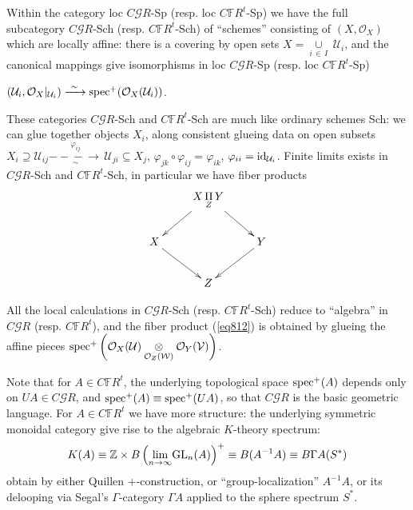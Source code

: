 \documentclass[leqno]{article}
\numberwithin{equation}{section}
\begin{document}
Within the category loc $C{\mathcal G} R$-Sp (resp. loc $C{\mathbb F} R^t$-Sp) we have the full subcategory $C{\mathcal G} R$-Sch (resp. $C{\mathbb F} R^t$-Sch) of ``schemes'' consisting of $(X , {\mathcal O}_X)$ which are locally affine: there is a covering by open sets \qquad \quad \qquad $X = \underset{i \, \in \, I}{\cup} \ {\mathcal U}_i$, and the canonical mappings give isomorphisms in loc $C{\mathcal G} R$-Sp (resp. loc $C{\mathbb F} R^t$-Sp) 

\noindent $({\mathcal U}_i , {\mathcal O}_X \vert_{{\mathcal U}_i}) \xrightarrow{ \ \sim \ } {\rm spec}^+ ({\mathcal O}_X ({\mathcal U}_i))$.

\smallskip

These categories $C{\mathcal G} R$-Sch and $C{\mathbb F} R^t$-Sch are much like ordinary schemes Sch: we can glue together objects $X_i$, along consistent glueing data on open subsets $X_i \supseteq {\mathcal U}_{ij} \underset{\sim}{\overset{\varphi_{ij}}{-\!\!\!-\!\!\!-\!\!\!\longrightarrow}} \, {\mathcal U}_{ji} \subseteq X_j$, $\varphi_{jk} \circ \varphi_{ij} = \varphi_{ik}$, $\varphi_{ii} = {\rm id}_{{\mathcal U}_i}$. Finite limits exists in $C{\mathcal G} R$-Sch and $C{\mathbb F} R^t$-Sch, in particular we have fiber products
\begin{equation}
\label{eq812}
\xymatrix{
&X \, \underset{Z}{\Pi} \, Y \ar[ld] \ar[rd] \\
X\ar[rd] &&Y \ar[ld] \\
&Z
}
\end{equation}

All the local calculations in $C{\mathcal G} R$-Sch (resp. $C{\mathbb F} R^t$-Sch) reduce to ``algebra'' in $C{\mathcal G} R$ (resp. $C{\mathbb F} R^t$), and the fiber product (\ref{eq812}) is obtained by glueing the affine pieces ${\rm spec}^+ \left( {\mathcal O}_X ({\mathcal U}) \underset{{\mathcal O}_Z({\mathcal W})}{\otimes} {\mathcal O}_Y ({\mathcal V}) \right)$.

\smallskip

Note that for $A \in C{\mathbb F} R^t$, the underlying topological space ${\rm spec}^+ (A)$ depends only on $UA \in C{\mathcal G} R$, and ${\rm spec}^+ (A) \equiv {\rm spec}^+ (UA)$, so that $C{\mathcal G} R$ is the basic geometric language. For $A \in C{\mathbb F} R^t$ we have more structure: the underlying symmetric monoidal category give rise to the algebraic $K$-theory spectrum:
\begin{equation}
\label{eq813}
K(A) \equiv {\mathbb Z} \times B \left( \underset{n \to \infty}{\lim} {\rm GL}_n (A)\right)^+ \equiv B (A^{-1} A) \equiv B\Gamma A(S^*)
\end{equation}
obtain by either Quillen $+$-construction, or ``group-localization'' $A^{-1} A$, or its delooping via Segal's $\Gamma$-category $\Gamma A$ applied to the sphere spectrum $S^*$.
\end{document}

